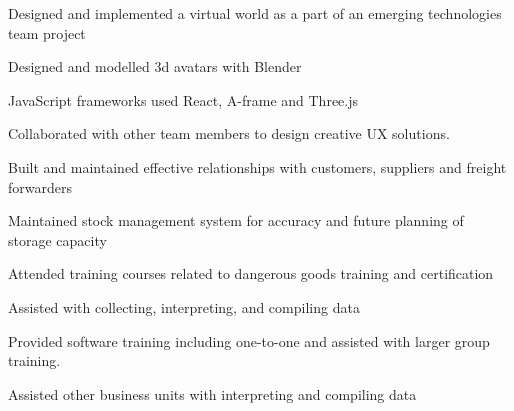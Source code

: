 \documentclass[]{deedy-resume-openfont}
\begin{document}
\begin{minipage}[t]{4in}
\begin{tightemize}
\item Designed and implemented a virtual world as a part of an emerging technologies team project
\item Designed and modelled 3d avatars with Blender
\item JavaScript frameworks used React, A-frame and Three.js
\item Collaborated with other team members to design creative UX solutions.
\end{tightemize}
\sectionsep

\begin{tightemize}
\item Built and maintained effective relationships with customers, suppliers and freight forwarders
\item Maintained stock management system for accuracy and future planning of storage capacity
\item Attended training courses related to dangerous goods training and certification
\end{tightemize}
\sectionsep

\vspace{\topsep} %
\begin{tightemize}
\item Assisted with collecting, interpreting, and compiling data
\item Provided software training including one-to-one and assisted with larger group training.
\item Assisted other business units with interpreting and compiling data
\end{tightemize}
\sectionsep






\end{minipage} 
\end{document}
